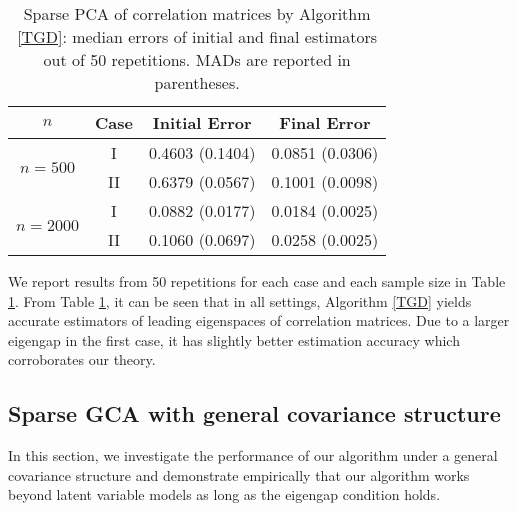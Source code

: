 \documentclass[11pt]{article}
\newcommand{\0}{{\mathbf{0}}}
\begin{document}
\begin{table}[h]
\centering
\begin{tabular}{c|c|c|c}
\hline
$n$ & Case & Initial Error  & Final Error  \\ \hline
\multirow{2}{*}{$n=500$} & I & 0.4603 (0.1404)   & 0.0851 (0.0306)   \\ \cline{2-4} 
 & II & 0.6379 (0.0567)   & 0.1001 (0.0098)   \\ \hline
\multirow{2}{*}{$n=2000$} & I & 0.0882 (0.0177)   & 0.0184 (0.0025)   \\ \cline{2-4} 
 & II & 0.1060 (0.0697) &   0.0258 (0.0025)   \\ \hline
\end{tabular}
\caption{Sparse PCA of correlation matrices by Algorithm \ref{TGD}: 
median errors of initial and final estimators out of 50 repetitions.
MADs are reported in parentheses.
}
\label{spca_sim}
\end{table}


We report results from 50 repetitions for each case and each sample size in Table \ref{spca_sim}.
From Table \ref{spca_sim}, it can be seen that in all settings, Algorithm \ref{TGD} yields accurate estimators of leading eigenspaces of correlation matrices. 
Due to a larger eigengap in the first case, it has slightly better estimation accuracy which corroborates our theory. 



\subsection{Sparse GCA with general covariance structure}
\label{sec:exp_general_covariance}
In this section, we investigate the performance of our algorithm under a general covariance structure and demonstrate empirically that our algorithm works beyond latent variable models as long as
the eigengap condition holds.
\end{document}
